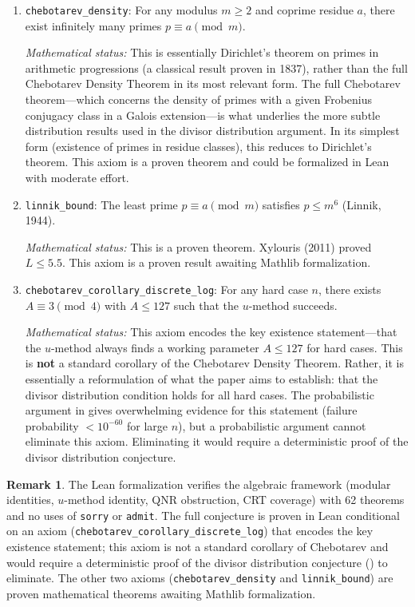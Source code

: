 \documentclass[11pt,a4paper]{article}
\theoremstyle{plain}
\theoremstyle{plain}
\theoremstyle{definition}
\newtheorem{remark}[theorem]{Remark}
\numberwithin{equation}{section}
\begin{document}
\begin{enumerate}
  \item \texttt{chebotarev\_density}: For any modulus $m \geq 2$ and coprime residue $a$, there exist infinitely many primes $p \equiv a \pmod{m}$.

  \emph{Mathematical status:} This is essentially Dirichlet's theorem on primes in arithmetic progressions (a classical result proven in 1837), rather than the full Chebotarev Density Theorem in its most relevant form. The full Chebotarev theorem---which concerns the density of primes with a given Frobenius conjugacy class in a Galois extension---is what underlies the more subtle distribution results used in the divisor distribution argument. In its simplest form (existence of primes in residue classes), this reduces to Dirichlet's theorem. This axiom is a proven theorem and could be formalized in Lean with moderate effort.

  \item \texttt{linnik\_bound}: The least prime $p \equiv a \pmod{m}$ satisfies $p \leq m^6$ (Linnik, 1944).

  \emph{Mathematical status:} This is a proven theorem. Xylouris (2011) proved $L \leq 5.5$. This axiom is a proven result awaiting Mathlib formalization.

  \item \texttt{chebotarev\_corollary\_discrete\_log}: For any hard case $n$, there exists $A \equiv 3 \pmod{4}$ with $A \leq 127$ such that the $u$-method succeeds.

  \emph{Mathematical status:} This axiom encodes the key existence statement---that the $u$-method always finds a working parameter $A \leq 127$ for hard cases. This is \textbf{not} a standard corollary of the Chebotarev Density Theorem. Rather, it is essentially a reformulation of what the paper aims to establish: that the divisor distribution condition holds for all hard cases. The probabilistic argument in  gives overwhelming evidence for this statement (failure probability $< 10^{-60}$ for large $n$), but a probabilistic argument cannot eliminate this axiom. Eliminating it would require a deterministic proof of the divisor distribution conjecture.
\end{enumerate}

\begin{remark}
The Lean formalization verifies the algebraic framework (modular identities, $u$-method identity, QNR obstruction, CRT coverage) with 62 theorems and no uses of \texttt{sorry} or \texttt{admit}. The full conjecture is proven in Lean conditional on an axiom (\texttt{chebotarev\_corollary\_discrete\_log}) that encodes the key existence statement; this axiom is not a standard corollary of Chebotarev and would require a deterministic proof of the divisor distribution conjecture () to eliminate. The other two axioms (\texttt{chebotarev\_density} and \texttt{linnik\_bound}) are proven mathematical theorems awaiting Mathlib formalization.
\end{remark}
\end{document}
